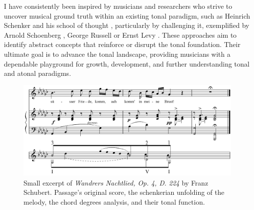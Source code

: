 I have consistently been inspired by musicians and researchers who strive to uncover musical ground truth within an existing tonal paradigm, such as Heinrich Schenker and his school of thought \cite{Komar1959SchenkersStructure}, particularly by challenging it, exemplified by Arnold Schoenberg \cite{Samson1974SchoenbergsMusic}, George Russell \cite{LydianRussell} or Ernst Levy \cite{LevyAHarmony}. These approaches aim to identify abstract concepts that reinforce or disrupt the tonal foundation. Their ultimate goal is to advance the tonal landscape, providing musicians with a dependable playground for growth, development, and further understanding tonal and atonal paradigms.


\begin{figure}[ht]
\includegraphics[clip,width=\columnwidth]{figures/schenkerian analysis/SchubertOp4no3.png}%
\caption[Small excerpt of \textit{Wandrers Nachtlied, Op. 4, D. 224} by Franz Schubert.]{\small{Small excerpt of \textit{Wandrers Nachtlied, Op. 4, D. 224} by Franz Schubert. Passage's original score, the schenkerian unfolding of the melody, the chord degrees analysis, and their tonal function.}}
\label{fig:Wandrers Nachtlied, Op. 4, D. 224}
\end{figure}